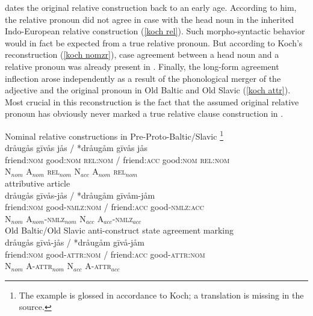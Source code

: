\citet[468, 470]{koch1999} dates the original relative construction back to an early  age. According to him, the relative pronoun did not agree in case with the head noun in the inherited Indo-European relative construction (\ref{koch rel}). Such morpho-syntactic behavior would in fact be expected from a true relative pronoun. But according to Koch's reconstruction (\ref{koch nomzr}), case agreement between a head noun and a relative pronoun was already present in . Finally, the long-form agreement inflection arose independently as a result of the phonological merger of the adjective and the original pronoun in Old Baltic and Old Slavic (\ref{koch attr}). Most crucial in this reconstruction is the fact that the assumed original relative pronoun has obviously never marked a true relative clause construction in .
\begin{exe}
\ex \label{koch rel}
\begin{xlist}
\ex	\rm{Nominal relative constructions in Pre-Proto\hyp{}Baltic\slash{}Slavic \citep[468]{koch1999}}\footnote{The example is glossed in accordance to Koch; a translation is missing in the source.}\\
\glll	*dråugås gīvås jås / *dråugåm gīvås jås\\
	friend:\textsc{nom} good:\textsc{nom} \textsc{rel:nom} / friend:\textsc{acc} good:\textsc{nom} \textsc{rel:nom}\\
	N$_{nom}$ A$_{nom}$ \textsc{rel}$_{nom}$ { } N$_{acc}$ A$_{nom}$ \textsc{rel}$_{nom}$\\
\ex	\rm{ attributive article}\\ \label{koch nomzr}
\glll	*dråugås gīvås-jås / *dråugåm gīvåm-jåm\\
	friend:\textsc{nom} good-\textsc{nmlz:nom} / friend:\textsc{acc} good-\textsc{nmlz:acc}\\
	N$_{nom}$ A$_{nom}$-\textsc{nmlz}$_{nom}$ { } N$_{acc}$ A$_{acc}$-\textsc{nmlz}$_{acc}$\\
\ex	\rm{Old Baltic/Old Slavic anti-construct state agreement marking}\\ \label{koch attr}
\glll	*dråugås gīvå-jås / *dråugåm gīvå-jåm\\
	friend:\textsc{nom} good-\textsc{attr:nom} / friend:\textsc{acc} good-\textsc{attr:nom}\\
	N$_{nom}$ A-\textsc{attr}$_{nom}$ { } N$_{acc}$ A-\textsc{attr}$_{acc}$\\
\end{xlist}
\end{exe}
